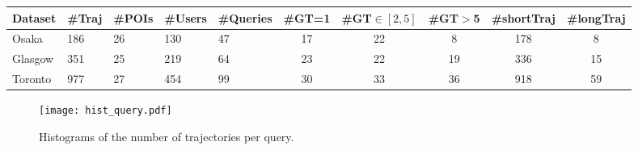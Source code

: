 \begin{table*}[t]
    \centering
		\small
		\begin{tabular}{lllll|ccc|cc} \hline %
		\textbf{Dataset} & \textbf{\#Traj} & \textbf{\#POIs} & \textbf{\#Users} & \textbf{\#Queries} & \textbf{\#GT=1} & \textbf{\#GT$\in [2,5]$} & \textbf{\#GT$>$5} & \textbf{\#shortTraj} & \textbf{\#longTraj} \\ \hline
		Osaka            & 186              & 26              & 130              & 47                 & 17              & 22                      & 8                 & 178                     & 8  \\
		Glasgow          & 351              & 25              & 219              & 64                 & 23              & 22                      & 19                & 336                     & 15 \\
        Toronto          & 977              & 27              & 454              & 99                 & 30              & 33                      & 36                & 918                     & 59 \\
		\hline
		\end{tabular}%
		\label{tab:data}
\end{table*}

\begin{figure}[t]
	\centering
	\texttt{[image: hist\_query.pdf]}
	\caption{Histograms of the number of trajectories per query.}
	\label{fig:hist_query}
\end{figure}


